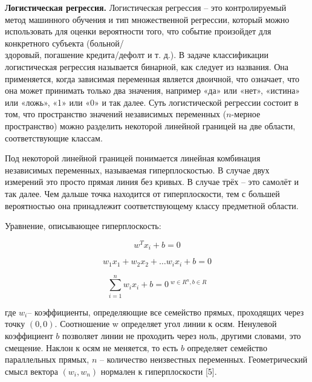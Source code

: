 \begin{multicols}{2}
{\bfseries Логистическая регрессия.} Логистическая регрессия -- это
контролируемый метод машинного обучения и тип множественной регрессии,
который можно использовать для оценки вероятности того, что событие
произойдет для конкретного субъекта (больной/\\здоровый, погашение
кредита/дефолт и т. д.). В задаче классификации логистическая регрессия
называется бинарной, как следует из названия. Она применяется, когда
зависимая переменная является двоичной, что означает, что она может
принимать только два значения, например «да» или «нет», «истина» или
«ложь», «1» или «0» и так далее. Суть логистической регрессии состоит в
том, что пространство значений независимых переменных
($n$-мерное пространство) можно разделить
некоторой линейной границей на две области, соответствующие классам.

Под некоторой линейной границей понимается линейная комбинация
независимых переменных, называемая гиперплоскостью. В случае двух
измерений это просто прямая линия без кривых. В случае трёх -- это
самолёт и так далее. Чем дальше точка находится от гиперплоскости, тем с
большей вероятностью она принадлежит соответствующему классу предметной
области.

Уравнение, описывающее гиперплоскость:

\begin{equation}
	w^Tx_i+b=0
\end{equation}

\begin{equation}
w_1x_1+w_2x_2+\ldots w_ix_i+b=0
\end{equation}

\begin{equation}
\sum_{i=1}^n w_ix_i+b=0 \ ^{ w \in R^n, b \in R}
\end{equation}


где $w_i$-- коэффициенты, определяющие все
семейство прямых, проходящих через точку $(0,0)$. Соотношение w определяет угол линии
к осям. Ненулевой коэффициент $ b$ позволяет линии не проходить через ноль, другими словами, это смещение.
Наклон к осям не меняется, то есть $ b$ определяет семейство параллельных прямых, $n $ -- количество неизвестных переменных.
Геометрический смысл вектора $(w_i, w_n)$ нормален к гиперплоскости {[}5{]}.


\end{multicols}

